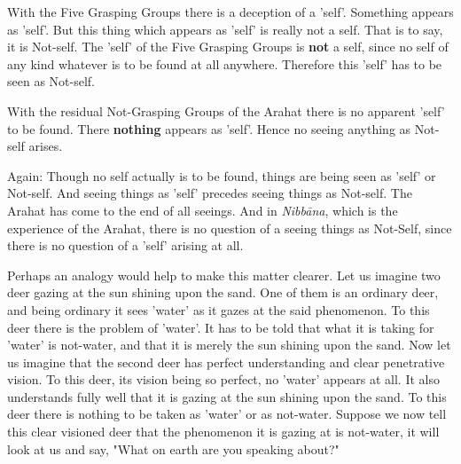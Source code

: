 With the Five Grasping Groups there is a deception of a 'self'. Something appears as 'self'. But this thing which appears as 'self' is really not a self. That is to say, it is Not-self. The 'self' of the Five Grasping Groups is \textbf{not} a self, since no self of any kind whatever is to be found at all anywhere. Therefore this 'self' has to be seen as Not-self.

With the residual Not-Grasping Groups of the Arahat there is no apparent 'self' to be found. There \textbf{nothing} appears as 'self'. Hence no seeing anything as Not-self arises.

Again: Though no self actually is to be found, things are being seen as 'self' or Not-self. And seeing things as 'self' precedes seeing things as Not-self. The Arahat has come to the end of all seeings. And in \emph{Nibbāna}, which is the experience of the Arahat, there is no question of a seeing things as Not-Self, since there is no question of a 'self' arising at all.

Perhaps an analogy would help to make this matter clearer. Let us imagine two deer gazing at the sun shining upon the sand. One of them is an ordinary deer, and being ordinary it sees 'water' as it gazes at the said phenomenon. To this deer there is the problem of 'water'. It has to be told that what it is taking for 'water' is not-water, and that it is merely the sun shining upon the sand. Now let us imagine that the second deer has perfect understanding and clear penetrative vision. To this deer, its vision being so perfect, no 'water' appears at all. It also understands fully well that it is gazing at the sun shining upon the sand. To this deer there is nothing to be taken as 'water' or as not-water. Suppose we now tell this clear visioned deer that the phenomenon it is gazing at is not-water, it will look at us and say, "What on earth are you speaking about?"

